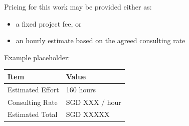 Pricing for this work may be provided either as:
\begin{itemize}[leftmargin=1.5em]
    \item a fixed project fee, or
    \item an hourly estimate based on the agreed consulting rate
\end{itemize}

Example placeholder:

\begin{tabularx}{\textwidth}{p{6cm}X}
\toprule
\textbf{Item} & \textbf{Value} \\
\midrule
Estimated Effort & 160 hours \\
Consulting Rate & SGD XXX / hour \\
Estimated Total & SGD XXXXX \\
\bottomrule
\end{tabularx}